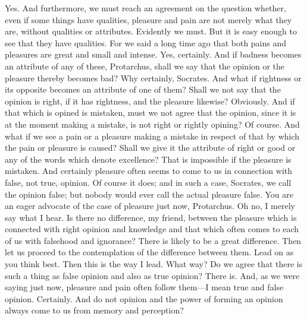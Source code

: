 \documentclass[letterpaper,12pt]{article}
\newcommand{\stephpag}[1]{\marginnote{\small\itshape\fontfamily{ppl}\selectfont #1}}
\begin{document}
\begin{drama}
\protarchusspeaks
Yes.
\socratesspeaks
And furthermore, we must reach an agreement on the question whether, even if some things have qualities, pleasure and pain are not merely what they are, without qualities or attributes.
\protarchusspeaks
Evidently we must.
\socratesspeaks
But it is easy enough to see that they have qualities. For we said a long time ago that both pains and pleasures \stephpag{d} are great and small and intense.
\protarchusspeaks
Yes, certainly.
\socratesspeaks
And if badness becomes an attribute of any of these, Protarchus, shall we say that the opinion or the pleasure thereby becomes bad?
\protarchusspeaks
Why certainly, Socrates.
\socratesspeaks
And what if rightness or its opposite becomes an attribute of one of them? Shall we not say that the opinion is right, if it has rightness, and the pleasure likewise?
\protarchusspeaks
Obviously. \stephpag{e}
\socratesspeaks
And if that which is opined is mistaken, must we not agree that the opinion, since it is at the moment making a mistake, is not right or rightly opining?
\protarchusspeaks
Of course.
\socratesspeaks
And what if we see a pain or a pleasure making a mistake in respect of that by which the pain or pleasure is caused? Shall we give it the attribute of right or good or any of the words which denote excellence?
\protarchusspeaks
That is impossible if the pleasure is mistaken.
\socratesspeaks
And certainly pleasure often seems to come to us in connection with false, not true, opinion.
\protarchusspeaks
Of course it does; and in such a case, Socrates, \stephpag{38 a} we call the opinion false; but nobody would ever call the actual pleasure false.
\socratesspeaks
You are an eager advocate of the case of pleasure just now, Protarchus.
\protarchusspeaks
Oh no, I merely say what I hear.
\socratesspeaks
Is there no difference, my friend, between the pleasure which is connected with right opinion and knowledge and that which often comes to each of us with falsehood and ignorance? \stephpag{b}
\protarchusspeaks
There is likely to be a great difference.
\socratesspeaks
Then let us proceed to the contemplation of the difference between them.
\protarchusspeaks
Lead on as you think best.
\socratesspeaks
Then this is the way I lead.
\protarchusspeaks
What way?
\socratesspeaks
Do we agree that there is such a thing as false opinion and also as true opinion?
\protarchusspeaks
There is.
\socratesspeaks
And, as we were saying just now, pleasure and pain often follow them---I mean true and false opinion.
\protarchusspeaks
Certainly.
\socratesspeaks
And do not opinion and the power of forming an opinion always come to us \stephpag{c} from memory and perception?

\end{drama}
\end{document}
